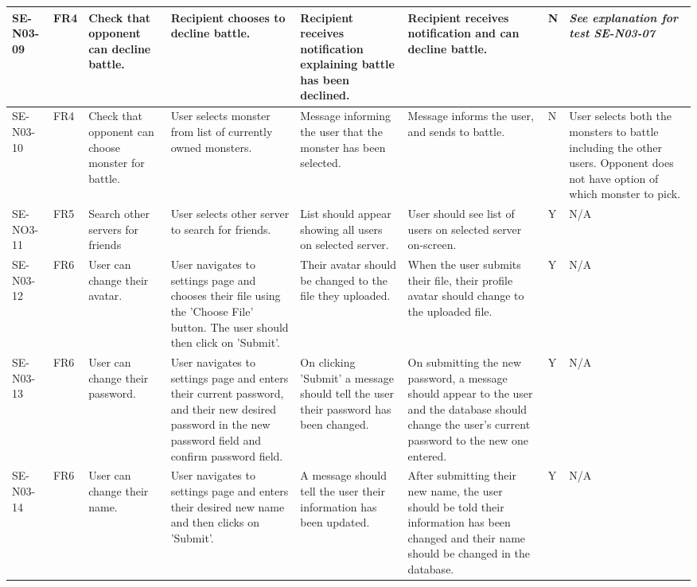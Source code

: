 \documentclass[a4paper]{article}
\begin{document}
\begin{landscape}
\begin{center}
\begin{tabular}{| l | l | p{3cm} | p{3cm} | p{4cm} | p{4cm} |p{1cm} |p{3cm} |}
\end{tabular}
\end{center}

\clearpage

\begin{center}
\thispagestyle{empty}
		
	\begin{tabular}{| l | l | p{3cm} | p{3cm} | p{4cm} | p{4cm} |p{1cm} |p{3cm} |}
\hline
	SE-N03-09 & FR4 & Check that opponent can decline battle. & Recipient chooses to decline battle. & Recipient receives notification explaining battle has been declined. & Recipient receives notification and can decline battle.& N & \emph{See explanation for test SE-N03-07} \\
\hline
	SE-N03-10 & FR4 &Check that opponent can choose monster for battle. & User selects monster from list of currently owned monsters. & Message informing the user that the monster has been selected. & Message informs the user, and sends to battle. & N & User selects both the monsters to battle including the other users. Opponent does not have option of which monster to pick. \\
\hline
	SE-NO3-11 & FR5 & Search other servers for friends &  User selects other server to search for friends. & List should appear showing all users on selected server. & User should see list of users on selected server on-screen.  & Y & N/A\\
\hline
	SE-N03-12 & FR6 & User can change their avatar. & User navigates to settings page and chooses their file using the 'Choose File' button. The user should then click on 'Submit'. & Their avatar should be changed to the file they uploaded. & When the user submits their file, their profile avatar should change to the uploaded file.& Y & N/A\\
\hline
	SE-N03-13 & FR6 & User can change their password. & User navigates to settings page and enters their current password, and their new desired password in the new password field and confirm password field. & On clicking 'Submit' a message should tell the user their password has been changed. & On submitting the new password, a message should appear to the user and the database should change the user's current password to the new one entered.& Y & N/A\\
\hline
	SE-N03-14 & FR6 & User can change their name. & User navigates to settings page and enters their desired new name and then clicks on 'Submit'. & A message should tell the user their information has been updated. & After submitting their new name, the user should be told their information has been changed and their name should be changed in the database.& Y & N/A\\
\hline
	

\end{tabular}
\end{center}
\end{landscape}
\end{document}
